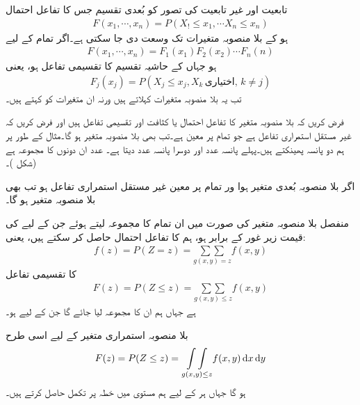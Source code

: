 تابعیت اور غیر تابعیت کی تصور کو  بُعدی تقسیم  جس کا تفاعل احتمال
\begin{align*}
F(x_1,\cdots,x_n)=P(X_!\le x_1,\cdots X_n\le x_n)
\end{align*}
ہو کے  بلا منصوبہ متغیرات  تک وسعت دی جا سکتی ہے۔اگر تمام  کے لیے
\begin{align}
F(x_1,\cdots,x_n)=F_1(x_1)F_2(x_2)\cdots F_n(n)
\end{align}
ہو جہاں  کے حاشیہ تقسیم کا تقسیمی تفاعل  ہو، یعنی
\begin{align*}
F_j(x_j)=P(X_j\le x_j, X_k\, \text{اختیاری},\, k\ne j)
\end{align*}
تب یہ بلا منصوبہ متغیرات  کہلاتے ہیں ورنہ  ان متغیرات کو  کہتے ہیں۔

فرض کریں کہ بلا منصوبہ متغیر  کا تفاعل احتمال یا کثافت  اور تقسیمی تفاعل  ہیں اور فرض کریں کہ  غیر مستقل استمراری تفاعل ہے جو تمام  پر معین ہے۔تب  بھی بلا منصوبہ متغیر ہو گا۔مثال کے طور پر ہم دو پانسہ پھینکتے ہیں۔پہلے پانسہ عدد  اور دوسرا پانسہ عدد  دیتا ہے۔ عدد  ان دونوں کا مجموعہ ہے (شکل )۔

اگر  بلا منصوبہ   بُعدی متغیر ہوا ور تمام  پر   معین غیر مستقل استمراری تفاعل ہو  تب  بھی بلا منصوبہ متغیر ہو گا۔

منفصل بلا منصوبہ متغیر  کی صورت میں ان تمام  کا مجموعہ لیتے ہوئے جن کے لیے  کی قیمت زیر غور  کے برابر ہو،  ہم  کا تفاعل احتمال  حاصل کر سکتے ہیں، یعنی:
\begin{align}
f(z)=P(Z=z)=\underset{g(x,y)=z}{\sum\sum} f(x,y)
\end{align}
 کا تقسیمی تفاعل
\begin{align}
F(z)=P(Z\le z)=\underset{g(x,y)\le z}{\sum\sum} f(x,y)
\end{align}
ہے جہاں ہم ان  کا مجموعہ لیا جائے گا جن کے لیے  ہو۔

بلا منصوبہ استمراری متغیر  کے لیے اسی طرح
\begin{align}
F(z)=P(Z\le z) =\underset{g(x,y)\le z}{\int\int} f(x,y)\dif x\dif y
\end{align}
ہو گا جہاں ہر  کے لیے ہم  مستوی میں خطہ  پر تکمل حاصل کرتے ہیں۔

